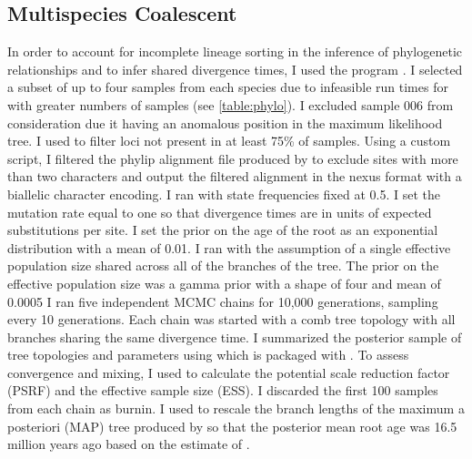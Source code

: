 \subsection{Multispecies Coalescent}
In order to account for incomplete lineage sorting in the inference of phylogenetic
relationships and to infer shared divergence times, I used the program \phycoeval \parencite{oaks2022}.
I selected a subset of up to four samples from each species due to
infeasible run times for \phycoeval with greater numbers of samples (see \cref{table:phylo}).
I excluded sample 006 from consideration due it having an anomalous   
position in the maximum likelihood tree.
I used \pyrad to filter loci not present in at least 75\% of samples. 
Using a custom script, I filtered the phylip alignment file produced by \pyrad 
to exclude sites with more than two characters and output the filtered alignment 
in the nexus format with a biallelic character encoding. 
I ran \phycoeval with state frequencies fixed at 0.5.
I set the mutation rate equal to one so that divergence times are in units of 
expected substitutions per site. 
I set the prior on the age of the root as an exponential distribution with a mean
of 0.01.
I ran \phycoeval with the assumption of a single effective population size
shared across all of the branches of the tree.
The prior on the effective population size was a gamma prior with a shape of
four and mean of 0.0005
I ran five independent MCMC chains for 10,000 generations, sampling every 10 
generations.
Each chain was started with a comb tree topology with all branches sharing the
same divergence time. 
I summarized the posterior sample of tree topologies and parameters using 
\sumphycoeval which is packaged with \phycoeval \parencite{oaks2022}.
To assess convergence and mixing, I used \sumphycoeval to calculate the
potential scale reduction factor (PSRF) and the effective sample size (ESS).
I discarded the first 100 samples from each chain as burnin.
I used \sumphycoeval to rescale the branch lengths of the maximum a posteriori 
(MAP) tree produced by \sumphycoeval so that the posterior mean root age was 
16.5 million years ago based on the estimate of \cite{feng2017}.

